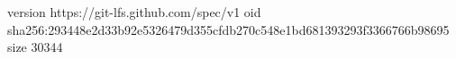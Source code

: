 version https://git-lfs.github.com/spec/v1
oid sha256:293448e2d33b92e5326479d355cfdb270c548e1bd681393293f3366766b98695
size 30344
